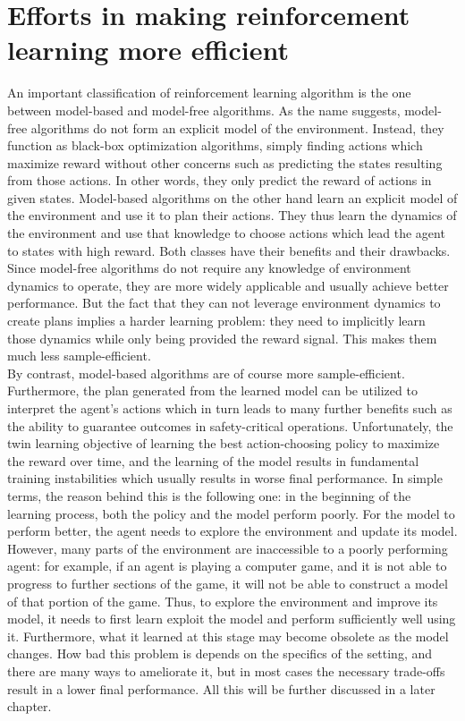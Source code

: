 \section{Efforts in making reinforcement learning more efficient}
\label{efforts-in-making-rl-efficient}
An important classification of reinforcement learning algorithm is the one between
model-based and model-free algorithms.
As the name suggests, model-free algorithms do not form an explicit model of the environment.
Instead, they function as black-box optimization algorithms, simply finding actions which maximize
reward without other concerns such as predicting the states resulting from those actions.
In other words, they only predict the reward of actions in given states.
Model-based algorithms on the other hand learn an explicit model of the environment
and use it to plan their actions.
They thus learn the dynamics of the environment and use that knowledge to choose actions
which lead the agent to states with high reward.
Both classes have their benefits and their drawbacks.
Since model-free algorithms do not require any knowledge of environment dynamics
to operate, they are more widely applicable and usually achieve better performance.
But the fact that they can not leverage environment dynamics to create plans implies
a harder learning problem: they need to implicitly learn those dynamics
while only being provided the reward signal. 
This makes them much less sample-efficient.\\

By contrast, model-based algorithms are of course more sample-efficient.
Furthermore, the plan generated from the learned model can be utilized to interpret the
agent's actions which in turn leads to many further benefits such as
the ability to guarantee outcomes in safety-critical operations.
Unfortunately, the twin learning objective of learning the best action-choosing policy 
to maximize the reward over time, and the learning of the model results
in fundamental training instabilities which usually results in worse final performance.
In simple terms, the reason behind this is the following one:
in the beginning of the learning process, both the policy and the model perform poorly.
For the model to perform better, the agent needs to explore the environment and
update its model.
However, many parts of the environment are inaccessible to a poorly performing agent:
for example, if an agent is playing a computer game, and it is not able to progress to further
sections of the game, it will not be able to construct a model of that portion of the game.
Thus, to explore the environment and improve its model, it needs to first learn exploit 
the model and perform sufficiently well using it.
Furthermore, what it learned at this stage may become obsolete as the model changes.
How bad this problem is depends on the specifics of the setting,
and there are many ways to ameliorate it,
but in most cases the necessary trade-offs result in a lower final performance.
All this will be further discussed in a later chapter.

